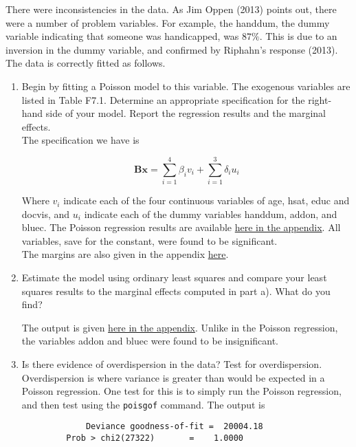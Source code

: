 \documentclass{article}
\begin{document}
There were inconsistencies in the data. As Jim Oppen (2013) points out, there were a number of problem variables. For example, the handdum, the dummy variable indicating that someone was handicapped, was $87\%$. This is due to an inversion in the dummy variable, and confirmed by Riphahn's response (2013). The data is correctly fitted as follows. 	



\begin{enumerate}[label=(\alph*)]
\item Begin by fitting a Poisson model to this variable. The exogenous variables are listed in Table F7.1. Determine an appropriate specification for the right-hand side of your model. Report the regression results and the marginal effects.\\

The specification we have is 

	$$ \textbf{Bx}= \sum_{i=1}^4\beta_i v_i + \sum_{i=1}^3 \delta_i u_i$$

Where $v_i$ indicate each of the four continuous variables of age, hsat, educ and docvis, and $u_i$ indicate each of the dummy variables handdum, addon, and bluec. The Poisson regression results are available \hyperlink{poisson}{here in the appendix}. All variables, save for the constant, were found to be significant.\\

The margins are also given in the appendix \hyperlink{margins}{here}.


\item Estimate the model using ordinary least squares and compare your least squares results to the marginal effects computed in part a). What do you find?

The output is given \hyperlink{ols}{here in the appendix}. Unlike in the Poisson regression, the variables addon and bluec were found to be insignificant.


\item Is there evidence of overdispersion in the data? Test for overdispersion.\\

Overdispersion is where variance is greater than would be expected in a Poisson regression. One test for this is to simply run the Poisson regression, and then test using the \texttt{poisgof} command. The output is \begin{verbatim}
	         Deviance goodness-of-fit =  20004.18
         Prob > chi2(27322)       =    1.0000


\end{verbatim}
\end{enumerate}
\end{document}
